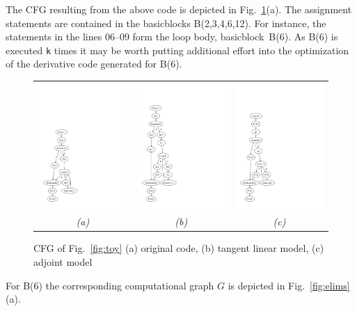\documentclass[11pt]{article}
\newcommand{\basicblock}{basicblock}
\newcommand{\reffig}[1]{{Fig.~\ref{#1}}}
\begin{document}
The CFG resulting from the above code is depicted in 
\reffig{fig:cfg}(a).
The assignment statements are contained in the {\basicblock}s B(2,3,4,6,12).
For instance, 
the statements  in the lines 06--09 form the loop body, \basicblock\ B(6).
As B(6) is executed
{\tt k} times it may be worth putting
additional effort into the optimization of the derivative code 
generated for B(6).
\begin{figure}[ht]
\centering
\begin{tabular}{ccc}
\includegraphics[width=.303\textwidth]{cfg_ts}
&
\includegraphics[width=.303\textwidth]{cfg_tape}
&
\includegraphics[width=.31\textwidth]{cfg_adj}
\\
\em (a) & \em (b) & \em (c)
\end{tabular}
\caption{CFG of \reffig{fig:toy} (a) original code, (b) tangent linear model, (c) adjoint model}\label{fig:cfg}
\end{figure}
For B(6) the corresponding computational graph $G$  is depicted in
\reffig{fig:elims}(a).  
\end{document}
